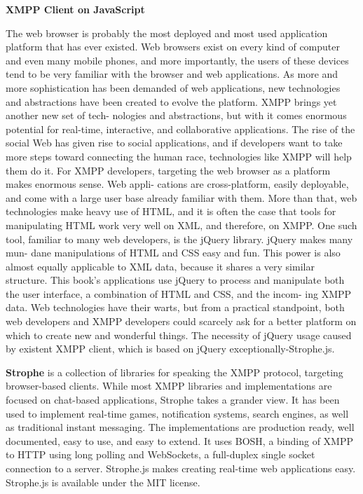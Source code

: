     \textbf{XMPP Client on JavaScript}

	  The web browser is probably the most deployed and most used application platform that has ever existed. Web browsers exist on every kind of computer and even many mobile phones, and more importantly, the users of these devices tend to be very familiar with the browser and web applications. As more and more sophistication has been demanded of web applications, new technologies and 	abstractions have been created to evolve the platform. XMPP brings yet another new set of tech- nologies and abstractions, but with it comes enormous potential for real-time, interactive, and collaborative applications. The rise of the social Web has given rise to social applications, and if developers want to take more steps toward connecting the human race, technologies like XMPP will help them do it. For XMPP developers, targeting the web browser as a platform makes enormous sense. Web appli- cations are cross-platform, easily deployable, and come with a large user base already familiar with them. More than that, web technologies make heavy use of HTML, and it is often the case that tools for manipulating HTML work very well on XML, and therefore, on XMPP. One such tool, familiar to many web developers, is the jQuery library. jQuery makes many mun- dane manipulations of HTML and CSS easy and fun. This power is also almost equally applicable to XML data, because it shares a very similar structure. This book’s applications use jQuery to process and manipulate both the user interface, a combination of HTML and CSS, and the incom- ing XMPP data. Web technologies have their warts, but from a practical standpoint, both web developers and XMPP developers could scarcely ask for a better platform on which to create new and wonderful things. The necessity of jQuery usage caused by existent XMPP client, which is based on jQuery exceptionally-Strophe.js.

    \textbf{Strophe} is a collection of libraries for speaking the XMPP protocol, targeting browser-based clients. While most XMPP libraries and implementations are focused on chat-based applications, Strophe takes a grander view. It has been used to implement real-time games, notification systems, search engines, as well as traditional instant messaging. The implementations are production ready, well documented, easy to use, and easy to extend. It uses BOSH, a binding of XMPP to HTTP using long polling and WebSockets, a full-duplex single socket connection to a server. Strophe.js makes creating real-time web applications easy. Strophe.js is available under the MIT license.



